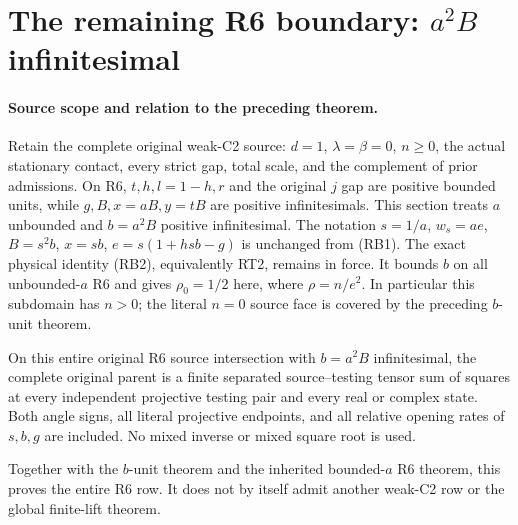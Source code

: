 \section{\texorpdfstring{The remaining R6 boundary: $a^2B$ infinitesimal}{The remaining R6 boundary: a2B infinitesimal}}
\label{component:p75b395956985}

\label{p75b395956985:sec:r6-b-inf}

\paragraph{Source scope and relation to the preceding theorem.}
Retain the complete original weak-C2 source: $d=1$, $\lambda=\beta=0$,
$n\geq0$, the actual stationary contact, every strict gap, total scale,
and the complement of prior admissions. On R6, $t,h,l=1-h,r$ and
the original $j$ gap are positive bounded units, while $g,B,x=aB,y=tB$
are positive infinitesimals. This section treats $a$ unbounded and
$b=a^2B$ positive infinitesimal. The notation $s=1/a$, $w_s=ae$,
$B=s^2b$, $x=sb$, $e=s(1+hsb-g)$ is unchanged from (RB1).
The exact physical identity (RB2), equivalently RT2, remains in force.
It bounds $b$ on all unbounded-$a$ R6 and gives $\rho_0=1/2$ here,
where $\rho=n/e^2$. In particular this subdomain has $n>0$; the
literal $n=0$ source face is covered by the preceding $b$-unit theorem.

\begin{theorem}
On this entire original R6 source intersection with $b=a^2B$
infinitesimal, the complete original parent is a finite separated
source--testing tensor sum of squares at every independent projective
testing pair and every real or complex state. Both angle signs, all
literal projective endpoints, and all relative opening rates of
$s,b,g$ are included. No mixed inverse or mixed square root is used.
\end{theorem}

Together with the $b$-unit theorem and the inherited bounded-$a$
R6 theorem, this proves the entire R6 row. It does not by itself
admit another weak-C2 row or the global finite-lift theorem.

